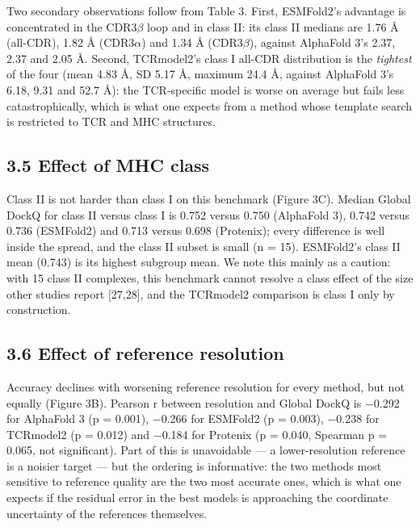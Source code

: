 \documentclass[
  11pt,
]{article}
\begin{document}
Two secondary observations follow from Table 3. First, ESMFold2's
advantage is concentrated in the CDR3\ensuremath{\beta} loop and in class II: its class
II medians are 1.76 \AA{} (all-CDR), 1.82 \AA{} (CDR3\ensuremath{\alpha}) and 1.34 \AA{} (CDR3\ensuremath{\beta}),
against AlphaFold 3's 2.37, 2.37 and 2.05 \AA{}. Second, TCRmodel2's class I
all-CDR distribution is the \emph{tightest} of the four (mean 4.83 \AA{}, SD
5.17 \AA{}, maximum 24.4 \AA{}, against AlphaFold 3's 6.18, 9.31 and 52.7 \AA{}):
the TCR-specific model is worse on average but fails less
catastrophically, which is what one expects from a method whose template
search is restricted to TCR and MHC structures.

\subsection{3.5 Effect of MHC class}\label{effect-of-mhc-class}

Class II is not harder than class I on this benchmark (Figure 3C).
Median Global DockQ for class II versus class I is 0.752 versus 0.750
(AlphaFold 3), 0.742 versus 0.736 (ESMFold2) and 0.713 versus 0.698
(Protenix); every difference is well inside the spread, and the class II
subset is small (n = 15). ESMFold2's class II mean (0.743) is its
highest subgroup mean. We note this mainly as a caution: with 15 class
II complexes, this benchmark cannot resolve a class effect of the size
other studies report {[}27,28{]}, and the TCRmodel2 comparison is class I only by
construction.

\subsection{3.6 Effect of reference
resolution}\label{effect-of-reference-resolution}

Accuracy declines with worsening reference resolution for every method,
but not equally (Figure 3B). Pearson r between resolution and Global
DockQ is \ensuremath{-}0.292 for AlphaFold 3 (p = 0.001), \ensuremath{-}0.266 for ESMFold2 (p =
0.003), \ensuremath{-}0.238 for TCRmodel2 (p = 0.012) and \ensuremath{-}0.184 for Protenix (p =
0.040, Spearman p = 0.065, not significant). Part of this is unavoidable
--- a lower-resolution reference is a noisier target --- but the
ordering is informative: the two methods most sensitive to reference
quality are the two most accurate ones, which is what one expects if the
residual error in the best models is approaching the coordinate
uncertainty of the references themselves.
\end{document}
